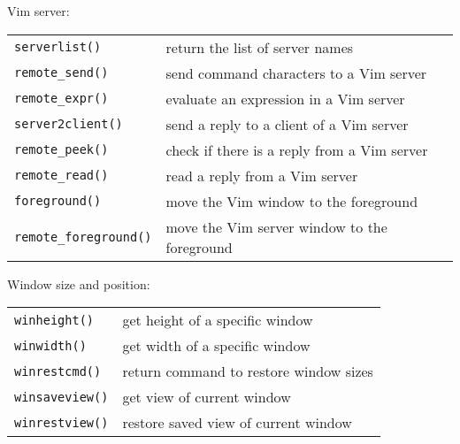 Vim server:
\label{server-functions}
\begin{center} \begin{tabular}{l l}
				\texttt{serverlist()} & return the list of server names \\
				\texttt{remote\_send()} & send command characters to a Vim server \\
				\texttt{remote\_expr()} & evaluate an expression in a Vim server \\
				\texttt{server2client()} & send a reply to a client of a Vim server \\
				\texttt{remote\_peek()} & check if there is a reply from a Vim server \\
				\texttt{remote\_read()} & read a reply from a Vim server \\
				\texttt{foreground()} & move the Vim window to the foreground \\
				\texttt{remote\_foreground()} & move the Vim server window to the foreground \\
\end{tabular} \end{center}

Window size and position:
\label{window-size-functions}
\begin{center} \begin{tabular}{l l}
				\texttt{winheight()} & get height of a specific window \\
				\texttt{winwidth()} & get width of a specific window \\
				\texttt{winrestcmd()} & return command to restore window sizes \\
				\texttt{winsaveview()} & get view of current window \\
				\texttt{winrestview()} & restore saved view of current window \\
\end{tabular} \end{center}

